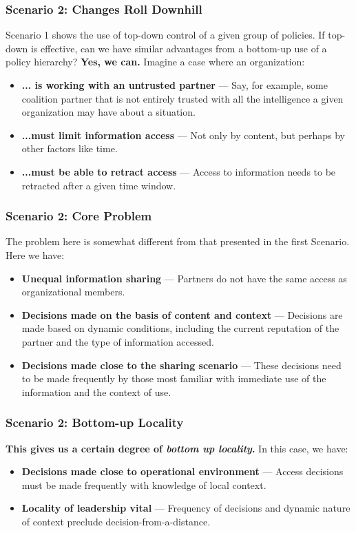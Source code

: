 \documentclass[t,handout, 10pt]{beamer}
\begin{document}
\begin{frame}
\frametitle{Scenario 2: Changes Roll Downhill}
Scenario 1 shows the use of top-down control of a given group of policies.  If top-down is effective, can we have similar advantages from a bottom-up use of a policy hierarchy?
\pause
\newline
\newline
\textbf{Yes, we can.}
\pause
\newline
\newline
Imagine a case where an organization:
\begin{itemize}
\item \textbf{... is working with an untrusted partner} --- Say, for example, some coalition partner that is not entirely trusted with all the intelligence a given organization may have about a situation.
\item \textbf{...must limit information access} --- Not only by content, but perhaps by other factors like time.
\item \textbf{...must be able to retract access} --- Access to information needs to be retracted after a given time window.
\end{itemize}
\end{frame}

\begin{frame}
\frametitle{Scenario 2: Core Problem}
The problem here is somewhat different from that presented in the first Scenario.
\newline
\newline
\pause
Here we have:
\begin{itemize}
\item \textbf{Unequal information sharing} ---  Partners do not have the same access as organizational members.
\item \textbf{Decisions made on the basis of content and context} --- Decisions are made based on dynamic conditions, including the current reputation of the partner and the type of information accessed.
\item \textbf{Decisions made close to the sharing scenario} --- These decisions need to be made frequently by those most familiar with immediate use of the information and the context of use.
\end{itemize}
\end{frame}

\begin{frame}
\frametitle{Scenario 2: Bottom-up Locality}
\textbf{This gives us a certain degree of \textit{bottom up locality}.}
\newline
\newline
\pause
In this case, we have:
\pause
\begin{itemize}
\item \textbf{Decisions made close to operational environment} --- Access decisions must be made frequently with knowledge of local context.
\pause
\item \textbf{Locality of leadership vital} --- Frequency of decisions and dynamic nature of context preclude decision-from-a-distance.
\end{itemize}
\end{frame}
\end{document}
